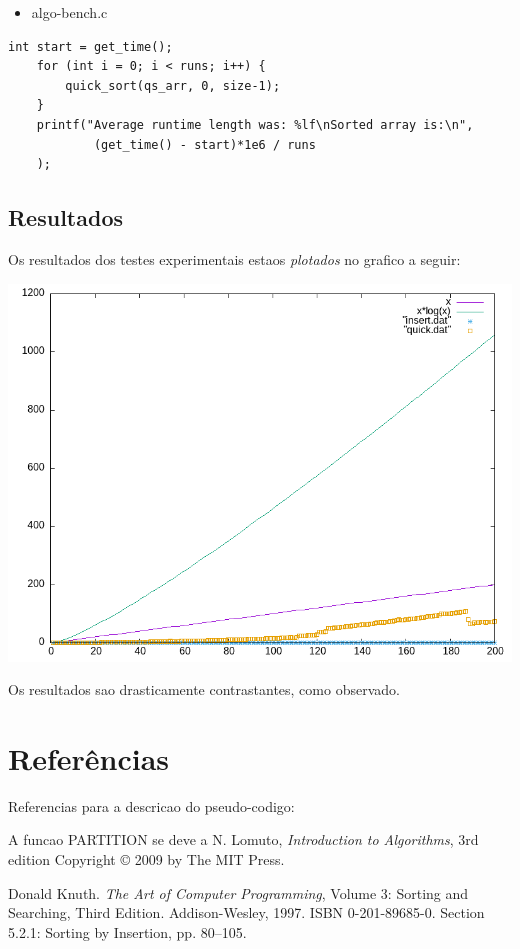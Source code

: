 \documentclass{article}
\renewcommand\texttt[1]{{\ttfamily\color{GruvOrange}#1}}
\begin{document}
\begin{itemize}
  \item{\texttt{algo-bench.c}}
\end{itemize}
\begin{verbatim}
int start = get_time();
    for (int i = 0; i < runs; i++) {
        quick_sort(qs_arr, 0, size-1);
    }
    printf("Average runtime length was: %lf\nSorted array is:\n",
            (get_time() - start)*1e6 / runs
    );
\end{verbatim}

\subsection{Resultados}

Os resultados dos testes experimentais estaos \textit{plotados} no grafico a seguir:

\includegraphics[scale=0.5]{graph}

Os resultados sao drasticamente contrastantes, como observado.

\section{Referências}

Referencias para a descricao do pseudo-codigo:

A funcao \texttt{PARTITION} se deve a N. Lomuto, \textit{Introduction to Algorithms}, 3rd edition Copyright © 2009 by The MIT Press.

Donald Knuth. \textit{The Art of Computer Programming}, Volume 3: Sorting and Searching, Third Edition. Addison-Wesley, 1997. ISBN 0-201-89685-0. Section 5.2.1: Sorting by Insertion, pp. 80–105.
\end{document}
